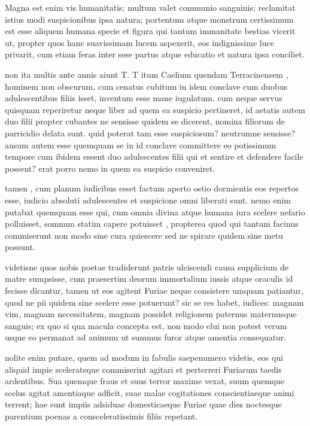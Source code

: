  Magna est enim vis humanitatis; multum valet communio sanguinis; reclamitat istius modi suspicionibus ipsa natura; portentum atque monstrum certissimum est esse aliquem humana specie et figura qui tantum immanitate bestias vicerit ut, propter quos hanc suavissimam lucem aspexerit, eos indignissime luce privarit, cum etiam feras inter sese partus atque educatio et natura ipsa conciliet.

 non ita multis ante annis aiunt T. T itum Caelium quendam Terracinensem , hominem non obscurum, cum cenatus cubitum in idem conclave cum duobus adulescentibus filiis isset, inventum esse mane iugulatum. cum neque servus quisquam reperiretur neque liber ad quem ea suspicio pertineret, id aetatis autem duo filii propter cubantes ne sensisse quidem se dicerent, nomina filiorum de parricidio delata sunt. quid poterat tam esse suspiciosum? neutrumne sensisse? ausum autem esse quemquam se in id conclave committere eo potissimum tempore cum ibidem essent duo adulescentes filii qui et sentire et defendere facile possent? erat porro nemo in quem ea suspicio conveniret.

 tamen , cum planum iudicibus esset factum aperto ostio dormientis eos repertos esse, iudicio absoluti adulescentes et suspicione omni liberati sunt. nemo enim putabat quemquam esse qui, cum omnia divina atque humana iura scelere nefario polluisset, somnum statim capere potuisset , propterea quod qui tantum facinus commiserunt non modo sine cura quiescere sed ne spirare quidem sine metu possunt.

 videtisne quos nobis poetae tradiderunt patris ulciscendi causa supplicium de matre sumpsisse, cum praesertim deorum immortalium iussis atque oraculis id fecisse dicantur, tamen ut eos agitent Furiae neque consistere umquam patiantur, quod ne pii quidem sine scelere esse potuerunt? sic se res habet, iudices: magnam vim, magnam necessitatem, magnam possidet religionem paternus maternusque sanguis; ex quo si qua macula concepta est, non modo elui non potest verum usque eo permanat ad animum ut summus furor atque amentia consequatur.

 nolite enim putare, quem ad modum in fabulis saepenumero videtis, eos qui aliquid impie scelerateque commiserint agitari et perterreri Furiarum taedis ardentibus. Sua quemque fraus et suus terror maxime vexat, suum quemque scelus agitat amentiaque adficit, suae malae cogitationes conscientiaeque animi terrent; hae sunt impiis adsiduae domesticaeque Furiae quae dies noctesque parentium poenas a consceleratissimis filiis repetant.

